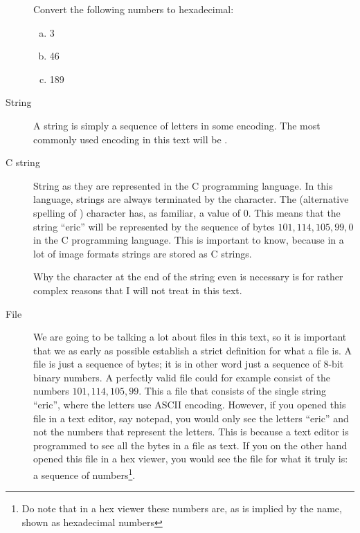 \begin{description}
  \begin{Exercise}[label={n-to-hex}]
    Convert the following numbers to hexadecimal:

    \begin{enumerate}[(a)]
    \item 3
    \item 46
    \item 189
    \end{enumerate}

  \end{Exercise}


\item[String] A string is simply a sequence of letters in some
  encoding. The most commonly used encoding in this text will be \ascii
  \cite{rfc20}.

\item[C string] String as they are represented in the C programming
  language. In this language, strings are always terminated by the
  \nul character\cite{kernighan1988c}. The \nullm(alternative spelling
  of \nul) character has, as familiar, a value of $0$. This means that
  the string ``eric'' will be represented by the sequence of bytes
  $101,114,105,99, 0$ in the C programming language. This is important
  to know, because in a lot of image formats strings are stored as C
  strings.

  Why the \nullm character at the end of the string even is necessary is
  for rather complex reasons that I will not treat in this text.

\item[File] We are going to be talking a lot about files in this text,
  so it is important that we as early as possible establish a strict
  definition for what a file is. A file is just a sequence of bytes;
  it is in other word just a sequence of 8-bit binary numbers. A
  perfectly valid file could for example consist of the numbers
  $101,114,105,99$. This a file that consists of the single string
  ``eric'', where the letters use ASCII encoding. However, if you
  opened this file in a text editor, say notepad, you would only see
  the letters ``eric'' and not the numbers that represent the
  letters. This is because a text editor is programmed to see all the
  bytes in a file as text. If you on the other hand opened this file
  in a hex viewer, you would see the file for what it truly is: a
  sequence of numbers\footnote{Do note that in a hex viewer these
    numbers are, as is implied by the name, shown as hexadecimal
    numbers}.


\end{description}
